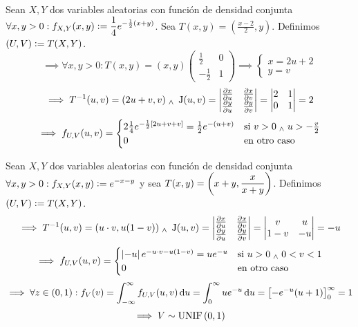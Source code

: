 \begin{ejem}
	Sean $X, Y$ dos variables aleatorias con función de densidad conjunta $\displaystyle \forall x, y > 0 : f_{X, Y}(x, y) \vcentcolon= \frac{1}{4} e^{-\frac{1}{2}(x+y)}$. Sea $T(x, y) = \left(\frac{x-2}{2}, y\right)$. Definimos $(U, V) \vcentcolon= T(X, Y)$.
	\[\implies \forall x, y > 0 : T(x, y) = (x, y)\begin{pmatrix}
			\frac{1}{2}  & 0 \\
			-\frac{1}{2} & 1
		\end{pmatrix} \implies \begin{cases}
			x = 2u + 2 \\
			y = v
		\end{cases}\]
	\[\implies T^{-1} (u, v) = (2u+v, v) \; _{\wedge} \; \operatorname{J}(u, v) = \begin{vmatrix}
			\pdv{x}{u} & \pdv{x}{v} \\
			\pdv{y}{u} & \pdv{y}{v}
		\end{vmatrix}=\begin{vmatrix}
			2 & 1 \\
			0 & 1
		\end{vmatrix} = 2\]
	\[\implies f_{U, V}(u, v) = \begin{cases}
			2\frac{1}{4}e^{-\frac{1}{2}[2u+v+v]} = \frac{1}{2} e^{-(u+v)} & \text{si } v > 0 \; _{\wedge} \; u > -\frac{v}{2} \\
			0                                                             & \text{en otro caso}
		\end{cases}\]
\end{ejem}

\begin{ejem}
	Sean $X, Y$ dos variables aleatorias con función de densidad conjunta $\displaystyle \forall x, y > 0 : f_{X, Y}(x, y) \vcentcolon= e^{-x-y}$ y sea $\displaystyle T(x, y) = \left(x+y, \frac{x}{x+y}\right)$. Definimos $(U, V) \vcentcolon= T(X, Y)$.
	\[\implies T^{-1}(u, v) = (u\cdot v, u(1-v)) \; _{\wedge} \; \operatorname{J}(u, v) = \begin{vmatrix}
			\pdv{x}{u} & \pdv{x}{v} \\
			\pdv{y}{u} & \pdv{y}{v}
		\end{vmatrix} = \begin{vmatrix}
			v   & u  \\
			1-v & -u
		\end{vmatrix} = -u\]
	\[\implies f_{U, V}(u, v) = \begin{cases}
			\left|-u\right| e^{-u\cdot v - u(1-v)} = u e^{-u} & \text{si } u > 0 \; _{\wedge} \; 0 < v < 1 \\
			0                                          & \text{en otro caso}
		\end{cases}\]
	\[\implies \forall z \in (0,1) : f_V(v) = \int_{-\infty}^{\infty} f_{U, V}(u, v) \odif{u} = \int_{0}^{\infty} u e^{-u} \odif{u} = \left[-e^{-u}(u+1)\right]_{0}^{\infty} = 1\]
	\[\implies V\sim\operatorname{UNIF}\left(0,1\right)\]
\end{ejem}

